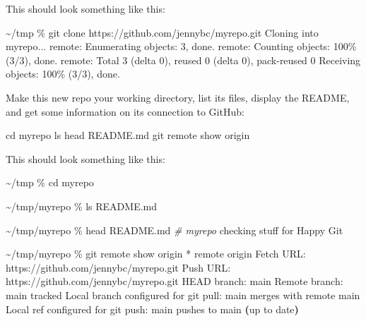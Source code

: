 \documentclass[
]{book}
\newenvironment{Shaded}{\begin{snugshade}}{\end{snugshade}}
\newcommand{\CommentTok}[1]{\textcolor[rgb]{0.56,0.35,0.01}{\textit{#1}}}
\newcommand{\ErrorTok}[1]{\textcolor[rgb]{0.64,0.00,0.00}{\textbf{#1}}}
\newcommand{\ExtensionTok}[1]{#1}
\newcommand{\KeywordTok}[1]{\textcolor[rgb]{0.13,0.29,0.53}{\textbf{#1}}}
\newcommand{\NormalTok}[1]{#1}
\newcommand{\StringTok}[1]{\textcolor[rgb]{0.31,0.60,0.02}{#1}}
\begin{document}
This should look something like this:

\begin{Shaded}
\begin{Highlighting}[]
\NormalTok{\textasciitilde{}/tmp \% git clone https://github.com/jennybc/myrepo.git}
\NormalTok{Cloning into \textquotesingle{}myrepo\textquotesingle{}...}
\NormalTok{remote: Enumerating objects: 3, done.}
\NormalTok{remote: Counting objects: 100\% (3/3), done.}
\NormalTok{remote: Total 3 (delta 0), reused 0 (delta 0), pack{-}reused 0}
\NormalTok{Receiving objects: 100\% (3/3), done.}
\end{Highlighting}
\end{Shaded}

Make this new repo your working directory, list its files, display the README, and get some information on its connection to GitHub:

\begin{Shaded}
\begin{Highlighting}[]
\NormalTok{cd myrepo}
\NormalTok{ls}
\NormalTok{head README.md}
\NormalTok{git remote show origin}
\end{Highlighting}
\end{Shaded}

This should look something like this:

\begin{Shaded}
\begin{Highlighting}[]
\ExtensionTok{\textasciitilde{}/tmp}\NormalTok{ \% cd myrepo}

\ExtensionTok{\textasciitilde{}/tmp/myrepo}\NormalTok{ \% ls}
\ExtensionTok{README.md}

\ExtensionTok{\textasciitilde{}/tmp/myrepo}\NormalTok{ \% head README.md }
\CommentTok{\# myrepo}
\ExtensionTok{checking}\NormalTok{ stuff for Happy Git}

\ExtensionTok{\textasciitilde{}/tmp/myrepo}\NormalTok{ \% git remote show origin}
\ExtensionTok{*}\NormalTok{ remote origin}
  \ExtensionTok{Fetch}\NormalTok{ URL: https://github.com/jennybc/myrepo.git}
  \ExtensionTok{Push}\NormalTok{  URL: https://github.com/jennybc/myrepo.git}
  \ExtensionTok{HEAD}\NormalTok{ branch: main}
  \ExtensionTok{Remote}\NormalTok{ branch:}
    \ExtensionTok{main}\NormalTok{ tracked}
  \ExtensionTok{Local}\NormalTok{ branch configured for }\StringTok{\textquotesingle{}git pull\textquotesingle{}}\NormalTok{:}
    \ExtensionTok{main}\NormalTok{ merges with remote main}
  \ExtensionTok{Local}\NormalTok{ ref configured for }\StringTok{\textquotesingle{}git push\textquotesingle{}}\NormalTok{:}
    \ExtensionTok{main}\NormalTok{ pushes to main }\ErrorTok{(}\ExtensionTok{up}\NormalTok{ to date}\KeywordTok{)}
\end{Highlighting}
\end{Shaded}
\end{document}
